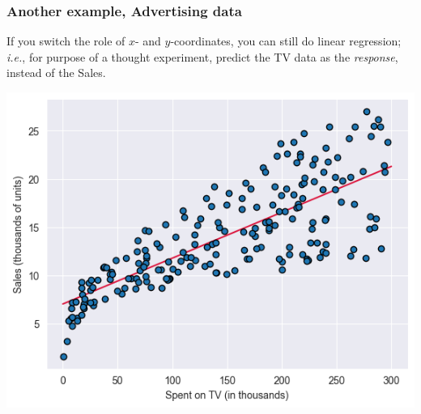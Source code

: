 \documentclass{beamer}
\theoremstyle{example}
\begin{document}
\begin{frame}[fragile]
\frametitle{Another example, Advertising data}
If you switch the role of $x$- and $y$-coordinates, you can still do linear regression; \textit{i.e.}, for purpose of a thought experiment, predict the TV data as the \emph{response}, instead of the Sales.


\vspace*{3pt}
\centering
\includegraphics[height=0.4\textheight]{../../Images/advertising-plot1.png}
\vfill

\end{frame}
    
\end{document}
